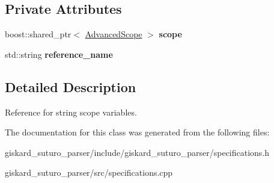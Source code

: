 \subsection*{Private Attributes}
\begin{DoxyCompactItemize}
\item 
\hypertarget{classgiskard__suturo_1_1StringReferenceSpec_a5efbdf748ce6210b092145e42c5319bc}{boost\-::shared\-\_\-ptr$<$ \hyperlink{classgiskard__suturo_1_1AdvancedScope}{Advanced\-Scope} $>$ {\bfseries scope}}\label{classgiskard__suturo_1_1StringReferenceSpec_a5efbdf748ce6210b092145e42c5319bc}

\item 
\hypertarget{classgiskard__suturo_1_1StringReferenceSpec_aa4eb4caee92c1f2348314ba82006c559}{std\-::string {\bfseries reference\-\_\-name}}\label{classgiskard__suturo_1_1StringReferenceSpec_aa4eb4caee92c1f2348314ba82006c559}

\end{DoxyCompactItemize}


\subsection{Detailed Description}
Reference for string scope variables. 

The documentation for this class was generated from the following files\-:\begin{DoxyCompactItemize}
\item 
giskard\-\_\-suturo\-\_\-parser/include/giskard\-\_\-suturo\-\_\-parser/specifications.\-h\item 
giskard\-\_\-suturo\-\_\-parser/src/specifications.\-cpp\end{DoxyCompactItemize}
